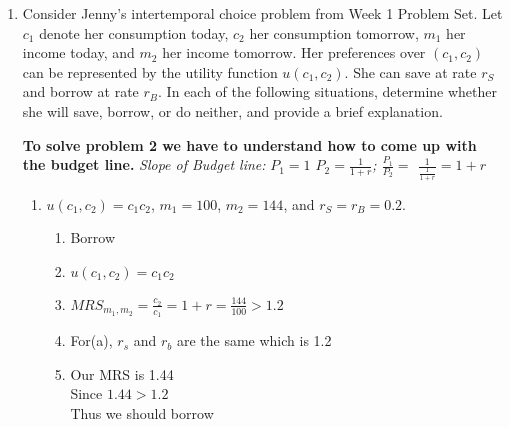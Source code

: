 \documentclass[11pt]{article}
\begin{document}
\begin{enumerate}
\begin{enumerate}
\begin{enumerate}
        \end{enumerate}
    \end{enumerate}

\item Consider Jenny's intertemporal choice problem from Week 1 Problem Set. Let $c_{1}$ denote her consumption today, $c_{2}$ her consumption tomorrow, $m_{1}$ her income today, and $m_{2}$ her income tomorrow. Her preferences over $(c_{1},c_{2})$ can be represented by the utility function $u(c_{1},c_{2})$. She can save at rate $r_{S}$ and borrow at rate $r_{B}$. In each of the following situations, determine whether she will save, borrow, or do neither, and provide a brief explanation.

\textbf{To solve problem 2 we have to understand how to come up with the budget line.}
\textit{Slope of Budget line:} \textit{$P_1 = 1$ $P_2 = \frac{1}{1+r}$; \hspace{1cm} $\frac{P_1}{P_2}  = $ $\frac{1}{\frac{1}{1+r}} = 1 + r$}

    \begin{enumerate}
        \item $u(c_{1},c_{2})=c_{1}c_{2}$, $m_{1}=100$, $m_{2}=144$, and $r_{S}=r_{B}=0.2$.
        \begin{enumerate}
            \item Borrow
            \item $u(c_1,c_2) =c_1c_2$
            \item $MRS_{{m_1},{m_2}} = \frac{c_2}{c_1} = 1 + r = \frac{144}{100} > 1.2$
            \item For(a), $r_s$ and $r_b$ are the same which is 1.2
            \item Our MRS is 1.44\\
            Since $1.44 > 1.2$
            \\Thus we should borrow
        \end{enumerate}


\end{enumerate}
\end{enumerate}
\end{document}
